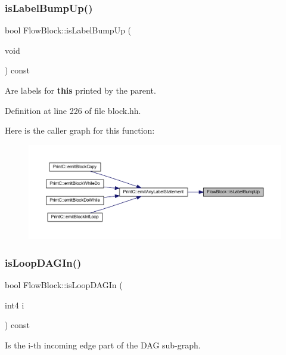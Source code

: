 \subsubsection{\texorpdfstring{isLabelBumpUp()}{isLabelBumpUp()}}
{\footnotesize\ttfamily bool Flow\+Block\+::is\+Label\+Bump\+Up (\begin{DoxyParamCaption}\item[{void}]{ }\end{DoxyParamCaption}) const\hspace{0.3cm}{\ttfamily [inline]}}



Are labels for {\bfseries{this}} printed by the parent. 



Definition at line 226 of file block.\+hh.

Here is the caller graph for this function\+:
\nopagebreak
\begin{figure}[H]
\begin{center}
\leavevmode
\includegraphics[width=350pt]{class_flow_block_afe445faa27ff80aab7f9830068da9d39_icgraph}
\end{center}
\end{figure}
\mbox{\label{class_flow_block_a31db534d506fdf721189b553f869cd33}} 
\subsubsection{\texorpdfstring{isLoopDAGIn()}{isLoopDAGIn()}}
{\footnotesize\ttfamily bool Flow\+Block\+::is\+Loop\+D\+A\+G\+In (\begin{DoxyParamCaption}\item[{int4}]{i }\end{DoxyParamCaption}) const\hspace{0.3cm}{\ttfamily [inline]}}



Is the i-\/th incoming edge part of the D\+AG sub-\/graph. 



